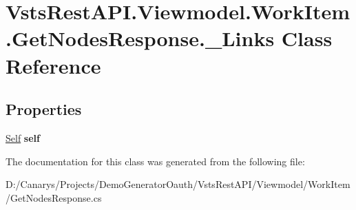 \hypertarget{class_vsts_rest_a_p_i_1_1_viewmodel_1_1_work_item_1_1_get_nodes_response_1_1___links}{}\section{Vsts\+Rest\+A\+P\+I.\+Viewmodel.\+Work\+Item.\+Get\+Nodes\+Response.\+\_\+\+Links Class Reference}
\label{class_vsts_rest_a_p_i_1_1_viewmodel_1_1_work_item_1_1_get_nodes_response_1_1___links}
\subsection*{Properties}
\begin{DoxyCompactItemize}
\item 
\mbox{\label{class_vsts_rest_a_p_i_1_1_viewmodel_1_1_work_item_1_1_get_nodes_response_1_1___links_a1ab9e264fd0e5331d719d1f21d498926}} 
\mbox{\hyperlink{class_vsts_rest_a_p_i_1_1_viewmodel_1_1_work_item_1_1_get_nodes_response_1_1_self}{Self}} {\bfseries self}
\end{DoxyCompactItemize}


The documentation for this class was generated from the following file\+:\begin{DoxyCompactItemize}
\item 
D\+:/\+Canarys/\+Projects/\+Demo\+Generator\+Oauth/\+Vsts\+Rest\+A\+P\+I/\+Viewmodel/\+Work\+Item/Get\+Nodes\+Response.\+cs\end{DoxyCompactItemize}
